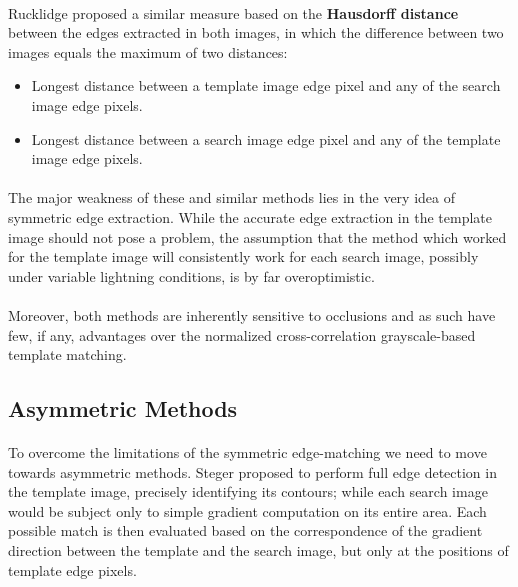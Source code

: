 \paragraph*{}
Rucklidge proposed\cite{Rucklidge95} a similar measure based on the \textbf{Hausdorff distance} between the edges extracted in both images, in which the difference between two images equals the maximum of two distances:
\begin{itemize}
	\item Longest distance between a template image edge pixel and any of the search image edge pixels.
	\item Longest distance between a search image edge pixel and any of the template image edge pixels.
\end{itemize}

\paragraph*{}
The major weakness of these and similar methods lies in the very idea of symmetric edge extraction. While the accurate edge extraction in the template image should not pose a problem, the assumption that the method which worked for the template image will consistently work for each search image, possibly under variable lightning conditions, is by far overoptimistic.

\paragraph*{}
Moreover, both methods are inherently sensitive to occlusions and as such have few, if any, advantages over the normalized cross-correlation grayscale-based template matching.

\subsection{Asymmetric Methods}

\paragraph*{}
To overcome the limitations of the symmetric edge-matching we need to move towards asymmetric methods. Steger proposed\cite{Steger02} to perform full edge detection in the template image, precisely identifying its contours; while each search image would be subject only to simple gradient computation on its entire area. Each possible match is then evaluated based on the correspondence of the gradient direction between the template and the search image, but only at the positions of template edge pixels.

